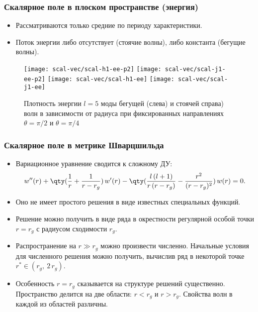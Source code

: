 \documentclass[compress, 9pt]{beamer}
\begin{document}
    \begin{frame}\frametitle{Скалярное поле в плоском пространстве (энергия)}

        \begin{itemize}\justifying
            \item Рассматриваются только средние по периоду характеристики.
            \item Поток энергии либо отсутствует (стоячие волны), либо константа (бегущие волны).
        \end{itemize}
        \begin{figure}[h]
            \centering
            \texttt{[image: scal-vec/scal-h1-ee-p2]}\hspace{8pt}%
            \texttt{[image: scal-vec/scal-j1-ee-p2]}\hspace{8pt}%
            \texttt{[image: scal-vec/scal-h1-ee]}\hspace{8pt}%
            \texttt{[image: scal-vec/scal-j1-ee]}\hspace{8pt}%
            \caption[]{Плотность энергии $l=5$ моды бегущей (слева) и стоячей справа) волн в зависимости от радиуса при фиксированных направлениях $\theta = \pi/2$ и $\theta = \pi/4$}%
        \end{figure}

    \end{frame}

    \begin{frame}\frametitle{Скалярное поле в метрике Шварцшильда}

        \begin{itemize}\justifying
            \item Вариационное уравнение сводится к сложному ДУ:
            \begin{equation*}
                w''(r) + \qty(\frac{1}{r} + \frac{1}{r - r_g})\, w'(r) - \qty(\frac{l\,(l+1)}{r\, (r-r_g)} - \frac{r^2}{(r-r_g)^2})\, w(r) = 0.
            \end{equation*}
            \item Оно не имеет простого решения в виде известных специальных функций.
            \item Решение можно получить в виде ряда в окрестности регулярной особой точки\nocite{whittaker_watson_1, fedoryuk_de} $r = r_g$ с радиусом сходимости $r_g$.
            \item Распространение на $r \gg r_g$ можно произвести численно. Начальные условия для численного решения можно получить, вычислив ряд в некоторой точке $r^* \in (r_g,\ 2\, r_g)$.
            \item Особенность $r = r_g$ сказывается на структуре решений существенно. Пространство делится на две области: $r < r_g$ и $r > r_g$. Свойства волн в каждой из областей различны.
        \end{itemize}

    \end{frame}
\end{document}
